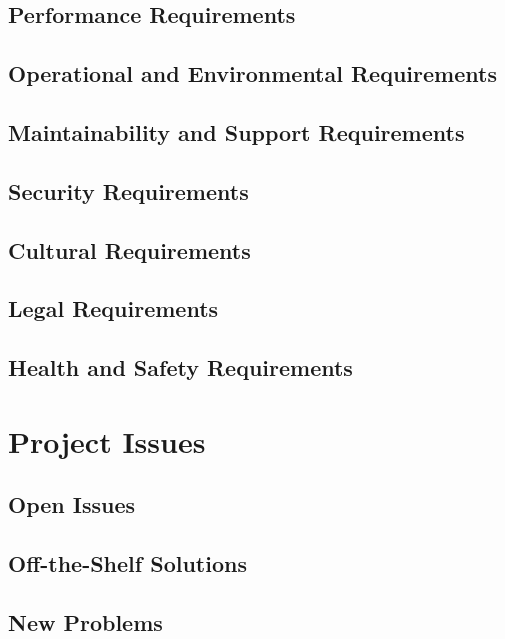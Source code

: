 \documentclass[11pt]{article}
\begin{document}
\subsection{Performance Requirements}

\subsection{Operational and Environmental Requirements}

\subsection{Maintainability and Support Requirements}

\subsection{Security Requirements}

\subsection{Cultural Requirements}

\subsection{Legal Requirements}

\subsection{Health and Safety Requirements}

\section{Project Issues}

\subsection{Open Issues}
\subsection{Off-the-Shelf Solutions}
\subsection{New Problems}
\end{document}
